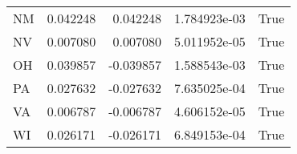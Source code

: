 \begin{table}
\begin{tabular}{lrrrl}
      NM &   0.042248 &  0.042248 &   1.784923e-03 &          True \\
      NV &   0.007080 &  0.007080 &   5.011952e-05 &          True \\
      OH &   0.039857 & -0.039857 &   1.588543e-03 &          True \\
      PA &   0.027632 & -0.027632 &   7.635025e-04 &          True \\
      VA &   0.006787 & -0.006787 &   4.606152e-05 &          True \\
      WI &   0.026171 & -0.026171 &   6.849153e-04 &          True \\
\bottomrule
\end{tabular}
\end{table}
